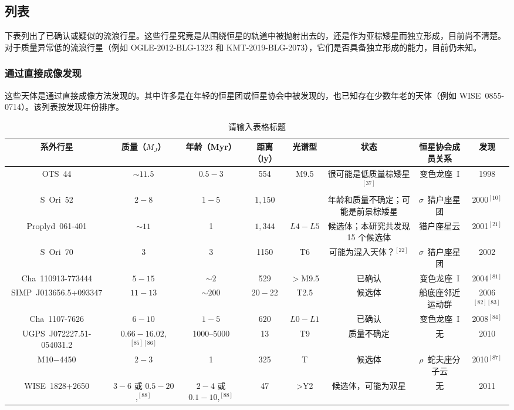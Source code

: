 \subsection{列表}
下表列出了已确认或疑似的流浪行星。这些行星究竟是从围绕恒星的轨道中被抛射出去的，还是作为亚棕矮星而独立形成，目前尚不清楚。对于质量异常低的流浪行星（例如 OGLE-2012-BLG-1323 和 KMT-2019-BLG-2073），它们是否具备独立形成的能力，目前仍未知。
\subsubsection{通过直接成像发现}
这些天体是通过直接成像方法发现的。其中许多是在年轻的恒星团或恒星协会中被发现的，也已知存在少数年老的天体（例如 WISE~0855-0714）。该列表按发现年份排序。

\begin{table}[ht]
\centering
\caption{请输入表格标题}\label{tab_RoPl1}
\begin{tabular}{|c|c|c|c|c|c|c|c|}
\hline
\textbf{系外行星} & \textbf{质量（$M_J$）}& \textbf{年龄（Myr）} &\textbf{ 距离（ly）} & \textbf{光谱型} & \textbf{状态} & \textbf{恒星协会成员关系} & \textbf{发现}\\
\hline
OTS~44 & $\sim11.5$ & $0.5-3 $& 554 & M9.5 & 很可能是低质量棕矮星$^{[37]}$ & 变色龙座~I & 1998\\
\hline
S~Ori~52 & $2-8$ & $1-5 $& $1{,}150$  &  & 年龄和质量不确定；可能是前景棕矮星 & $\sigma$~猎户座星团 & 2000$^{[10]}$\\
\hline
Proplyd~061-401 & $\sim11$ & 1 & $1{,}344$ & $L4-L5$ & 候选体；本研究共发现 15 个候选体 & 猎户座星云 & 2001$^{[21]}$\\
\hline
S~Ori~70 & 3 & 3 & 1150 & T6 & 可能为混入天体？$^{[22]}$ & $\sigma$~猎户座星团 & 2002\\
\hline
Cha~110913-773444 & $5-15$ & $\sim2$ & 529 & $>$M9.5 & 已确认 & 变色龙座~I & 2004$^{[81]}$\\
\hline
SIMP~J013656.5+093347 & $11-13$ & $\sim200$ & $20-22$ & T2.5 & 候选体 & 船底座邻近运动群 & 2006$^{[82][83]}$\\
\hline
Cha~1107-7626 & $6-10$ & $1-5$ & $620$ & $L0-L1$ & 已确认 & 变色龙座~I & 2008$^{[84]}$\\
\hline
UGPS~J072227.51-054031.2 & $0.66-16.02$,$^{[85][86]}$ & 1000--5000& 13 & T9 & 质量不确定 & 无 & 2010\\
\hline
M10$-$4450 & $2-3$ & 1 & 325 & T & 候选体 & $\rho$~蛇夫座分子云 & 2010$^{[87]}$\\
\hline
WISE~1828+2650 & $3-6$ 或 $0.5-20$,$^{[88]}$ & $2-4$ 或 $0.1-10$,$^{[88]}$ & 47 & >Y2 & 候选体，可能为双星 & 无 & 2011\\

\end{tabular}
\end{table}
